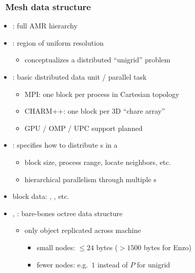 \begin{frame}[fragile] 
\frametitle{\cello\ Mesh data structure}
\begin{itemize}
\small
\item {}: full AMR hierarchy
\item {}: region of uniform resolution
  \begin{itemize}
  \item conceptualizes a distributed ``unigrid'' problem
  \end{itemize}
\item {}: basic distributed data unit / parallel task
  \begin{itemize}
  \item MPI: one block per process in Cartesian topology
  \item CHARM++: one block per 3D ``chare array''
  \item GPU / OMP / UPC support planned
  \end{itemize}
\item {}: specifies how to distribute s in a 
  \begin{itemize}
  \item block size, process range, locate neighbors, etc.
  \item hierarchical parallelism through multiple s
  \end{itemize}
\item block data: , , etc.
\item {}, : bare-bones octree data structure
  \begin{itemize}
  \item {} only object replicated across machine
    \begin{itemize}
    \item small nodes: $\le 24$ bytes ($>1500$ bytes for Enzo)
    \item fewer nodes: e.g.~$1$ instead of $P$ for unigrid
    \end{itemize}

  \end{itemize}
\end{itemize}

\end{frame}





